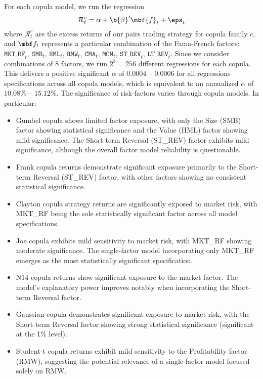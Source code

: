 For each copula model, we run the  regression
$$
\mathcal{R}_{t}^{c} = \alpha + \b{\beta}' \mbf{f}_t + \eps_t
$$
where 
$\mathcal{R}_{t}^{c}$ are the excess returns of our pairs trading strategy for copula family $c$, and 
$\mbf f_t$ represents a particular combination of the Fama-French factors: 
$\texttt{MKT\_RF}_t$, $\texttt{SMB}_t$, $\texttt{HML}_t$, $\texttt{RMW}_t$, $\texttt{CMA}_t$, $\texttt{MOM}_t$, $\texttt{ST\_REV}_t$, $\texttt{LT\_REV}_t$.
Since we consider combinations of 8 factors, we run $2^8=256$ different regressions for each copula. This delivers a positive significant $\alpha$ of  $0.0004$ -- $0.0006$ for all regressions specifications across all copula models, which is equivalent to an annualized $\alpha$ of $10.08\%$ -- $15.12\%$. The significance of risk-factors varies through copula models. In particular: 
\begin{itemize}[leftmargin=*,noitemsep]
  \item Gumbel copula shows limited factor exposure, with only the Size (SMB) factor showing statistical significance and the Value (HML) factor showing mild significance. The Short-term Reversal (ST\_REV) factor exhibits mild significance, although the overall factor model reliability is questionable.
  
  \item Frank copula returns demonstrate significant exposure primarily to the Short-term Reversal (ST\_REV) factor, with other factors showing no consistent statistical significance.
  
  \item Clayton copula strategy returns are significantly exposed to market risk, with MKT\_RF being the sole statistically significant factor across all model specifications.
  
  \item Joe copula exhibits mild sensitivity to market risk, with MKT\_RF showing moderate significance. The single-factor model incorporating only MKT\_RF emerges as the most statistically significant specification.
  
  \item N14 copula returns show significant exposure to the market factor. The model's explanatory power improves notably when incorporating the Short-term Reversal factor.
  
  \item Gaussian copula demonstrates significant exposure to market risk, with the Short-term Reversal factor showing strong statistical significance (significant at the 1\% level). 
  
  \item Student-t copula returns exhibit mild sensitivity to the Profitability factor (RMW), suggesting the potential relevance of a single-factor model focused solely on RMW.
\end{itemize}

